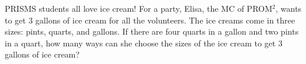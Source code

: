PRISMS students all love ice cream! For a party, Elisa, the MC of PROM$^2$, wants to get $3$ gallons of ice cream for all the volunteers. The ice creams come in three sizes: pints, quarts, and gallons. If there are four quarts in a gallon and two pints in a quart, how many ways can she choose the sizes of the ice cream to get $3$ gallons of ice cream?
